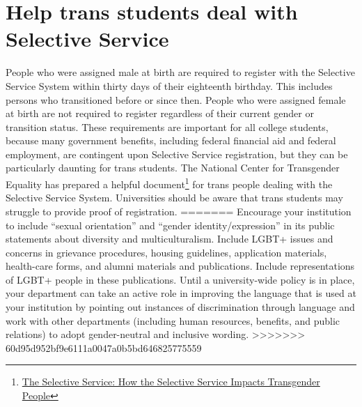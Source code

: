 \section {Help trans students deal with Selective Service}
\label{univ-trans}
People who were assigned male at birth are required to register with the Selective Service System within thirty days of their eighteenth birthday.  This includes persons who transitioned before or since then. People who were assigned female at birth are not required to register regardless of their current gender or transition status.  These requirements are important for all college students, because many government benefits, including federal financial aid and federal employment, are contingent upon Selective Service registration, but they can be particularly daunting for trans students.  The National Center for Transgender Equality has prepared a helpful document\footnote{\href{http://transequality.org/Resources/Selective_Service_only.pdf}{The Selective Service: How the Selective Service Impacts Transgender People}} for trans people dealing with the Selective Service System.  Universities should be aware that trans students may struggle to provide proof of registration.
=======
Encourage your institution to include ``sexual orientation'' and ``gender identity/expression'' in its public statements about diversity and multiculturalism.  Include LGBT+ issues and concerns in grievance procedures, housing guidelines, application materials, health-care forms, and alumni materials and publications.  Include representations of LGBT+ people in these publications.  Until a university-wide policy is in place, your department can take an active role in improving the language that is used at your institution by pointing out instances of discrimination through language and work with other departments (including human resources, benefits, and public relations) to adopt gender-neutral and inclusive wording.
>>>>>>> 60d95d952bf9e6111a0047a0b5bd646825775559


